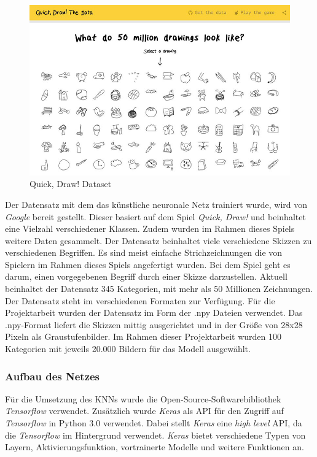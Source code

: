 \documentclass[11pt]{article}
\begin{document}
\begin{figure}[ht]
\centering
\includegraphics[width=1\textwidth]{images/QuickDrawData.jpg}
\caption{\label{fig:classDiagram}Quick, Draw! Dataset}
\end{figure}

Der Datensatz mit dem das künstliche neuronale Netz trainiert wurde, wird von \textit{Google} bereit gestellt. Dieser basiert auf dem Spiel \textit{Quick, Draw!} und beinhaltet eine Vielzahl verschiedener Klassen.  Zudem wurden im Rahmen dieses Spiels weitere Daten gesammelt. Der Datensatz beinhaltet viele verschiedene Skizzen zu verschiedenen Begriffen. Es sind meist einfache Strichzeichnungen die von Spielern im Rahmen dieses Spiels angefertigt wurden. Bei dem Spiel geht es darum, einen vorgegebenen Begriff durch einer Skizze darzustellen. Aktuell beinhaltet der Datensatz 345 Kategorien, mit mehr als 50 Millionen Zeichnungen. Der Datensatz steht im verschiedenen Formaten zur Verfügung.
Für die Projektarbeit wurden der Datensatz im Form der .npy Dateien verwendet. Das .npy-Format liefert die Skizzen mittig ausgerichtet und in der Größe von 28x28 Pixeln als Graustufenbilder.\parencite{GoogleCreativeLab2018}
Im Rahmen dieser Projektarbeit wurden 100 Kategorien mit jeweils 20.000 Bildern für das Modell ausgewählt.

\subsubsection{Aufbau des Netzes}
Für die Umsetzung des KNNs wurde die Open-Source-Softwarebibliothek \textit{Tensorflow} verwendet. Zusätzlich wurde \textit{Keras} als API für den Zugriff auf \textit{Tensorflow} in Python 3.0 verwendet. Dabei stellt \textit{Keras} eine \textit{high level} API, da die \textit{Tensorflow} im Hintergrund verwendet. \textit{Keras} bietet verschiedene Typen von Layern, Aktivierungsfunktion, vortrainerte Modelle und weitere Funktionen an.
\end{document}
